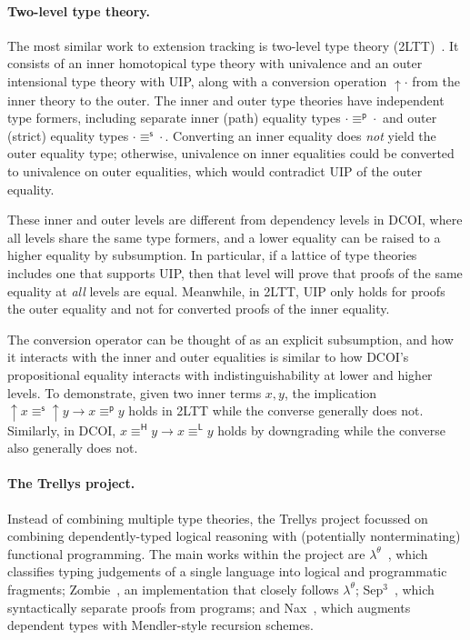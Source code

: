 \documentclass{article}
\newcommand{\HH}{\mathsf{H}}
\newcommand{\LL}{\mathsf{L}}
\newcommand{\oo}{\mathsf{s}}
\newcommand{\ii}{\mathsf{p}}
\begin{document}
\paragraph{Two-level type theory.}
The most similar work to extension tracking is two-level type theory (2LTT)~\citep{2ls,2ltt}.
It consists of an inner homotopical type theory with univalence
and an outer intensional type theory with UIP,
along with a conversion operation $\mathop{\uparrow} \cdot$ from the inner theory to the outer.
The inner and outer type theories have independent type formers,
including separate inner (path) equality types $\cdot \equiv^\ii \cdot$
and outer (strict) equality types $\cdot \equiv^\oo \cdot$.
Converting an inner equality does \emph{not} yield the outer equality type;
otherwise, univalence on inner equalities could be converted to univalence on outer equalities,
which would contradict UIP of the outer equality.

These inner and outer levels are different from dependency levels in DCOI,
where all levels share the same type formers,
and a lower equality can be raised to a higher equality by subsumption.
In particular, if a lattice of type theories includes one that supports UIP,
then that level will prove that proofs of the same equality at \emph{all} levels are equal.
Meanwhile, in 2LTT, UIP only holds for proofs the outer equality
and not for converted proofs of the inner equality.

The conversion operator can be thought of as an explicit subsumption,
and how it interacts with the inner and outer equalities
is similar to how DCOI's propositional equality interacts with indistinguishability
at lower and higher levels.
To demonstrate, given two inner terms $x, y$,
the implication $\mathop{\uparrow} x \equiv^\oo \mathop{\uparrow} y \to x \equiv^\ii y$
holds in 2LTT while the converse generally does not.
Similarly, in DCOI, $x \equiv^\HH y \to x \equiv^\LL y$ holds by downgrading
while the converse also generally does not.

\paragraph{The Trellys project.}
Instead of combining multiple type theories,
the Trellys project focussed on combining dependently-typed logical reasoning
with (potentially nonterminating) functional programming.
The main works within the project are $\lambda^\theta$~\citep{lambda-theta},
which classifies typing judgements of a single language into logical and programmatic fragments;
Zombie~\citep{zombie}, an implementation that closely follows $\lambda^\theta$;
Sep$^3$~\citep{sep3}, which syntactically separate proofs from programs;
and Nax~\citep{nax}, which augments dependent types with Mendler-style recursion schemes.
\end{document}

